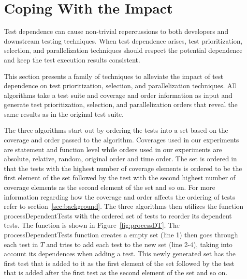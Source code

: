 \section{Coping With the Impact}
\label{sec:cope}

Test dependence can cause non-trivial repercussions
to both developers and downstream testing techniques.
When test dependence arises, test prioritization,
selection, and parallelization techniques
should respect the potential dependence and keep the
test execution results consistent.

This section presents a family of techniques to alleviate the
impact of test dependence on test prioritization, selection,
and parallelization techniques. All algorithms take a test suite and
coverage and order information as input and generate
test prioritization, selection, and parallelization orders that reveal
the same results as in the original test suite.


The three algorithms start out by ordering the tests into a set 
based on the coverage and order passed to the algorithm.
Coverages used in our experiments are statement
and function level while orders used in our experiments are absolute,
relative, random, original order and time order. The set is ordered
in that the tests with the highest number of coverage elements
is ordered to be the first element of the set followed by the test with
the second highest number of coverage elements as the second
element of the set and so on. For more information regarding how the coverage
and order affects the ordering of tests refer to section~\ref{sec:background}.
The three algorithms then utilizes the function processDependentTests
with the ordered set of tests to reorder its dependent tests.
The function is shown in Figure~\ref{fig:processDT}.
The processDependentTests function creates a empty set (line 1)
then goes through each test in $\mathit{T}$ and tries to add each
test to the new set (line 2-4), taking into account its dependences
when adding a test. This newly generated set has the first test
that is added to it as the first element of the set followed by the
test that is added after the first test as the second element of the set
and so on.


